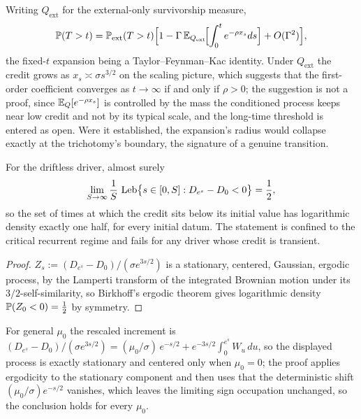 \begin{proposition}\label{prop:perturb}
Writing $Q_{\mathrm{ext}}$ for the external-only survivorship measure,
\begin{equation}\label{eq:perturb}
\mathbb{P}(T>t)=\mathbb{P}_{\mathrm{ext}}(T>t)\Bigl[1-\Gamma\,
\mathbb{E}_{Q_{\mathrm{ext}}}\!\Bigl[\int_0^te^{-\rho x_s}ds\Bigr]
+O(\Gamma^{2})\Bigr],
\end{equation}
the fixed-$t$ expansion being a Taylor--Feynman--Kac identity. Under
$Q_{\mathrm{ext}}$ the credit grows as $x_s\asymp\sigma s^{3/2}$ on
the scaling picture, which suggests that the first-order coefficient
converges as $t\to\infty$ if and only if $\rho>0$; the suggestion is
not a proof, since $\mathbb{E}_Q[e^{-\rho x_s}]$ is controlled by the mass the
conditioned process keeps near low credit and not by its typical
scale, and the long-time threshold is entered as open. Were it
established, the expansion's radius would collapse exactly at the
trichotomy's boundary, the signature of a genuine transition.
\end{proposition}

\begin{theorem}\label{thm:half}
For the driftless driver, almost surely
\begin{equation}\label{eq:half}
\lim_{S\to\infty}\frac1S\,\operatorname{Leb}\bigl\{s\in[0,S]:D_{e^{s}}-D_0<0\bigr\}=\frac12,
\end{equation}
so the set of times at which the credit sits below its initial value
has logarithmic density exactly one half, for every initial datum. The
statement is confined to the critical recurrent regime and fails for
any driver whose credit is transient.
\end{theorem}

\begin{proof}
$Z_s:=(D_{e^{s}}-D_0)/(\sigma e^{3s/2})$ is a stationary, centered,
Gaussian, ergodic process, by the Lamperti transform of the integrated
Brownian motion under its $3/2$-self-similarity, so Birkhoff's ergodic
theorem gives logarithmic density $\mathbb{P}(Z_0<0)=\tfrac12$ by symmetry.
\end{proof} For general $\mu_0$ the rescaled increment is $(D_{e^s}-D_0)/(\sigma e^{3s/2}) = (\mu_0/\sigma)\,e^{-s/2} + e^{-3s/2}\int_0^{e^s}W_u\,du$, so the displayed process is exactly stationary and centered only when $\mu_0 = 0$; the proof applies ergodicity to the stationary component and then uses that the deterministic shift $(\mu_0/\sigma)e^{-s/2}$ vanishes, which leaves the limiting sign occupation unchanged, so the conclusion holds for every $\mu_0$.


